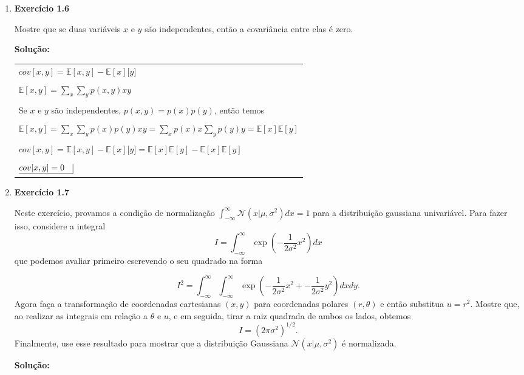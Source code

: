 \begin{enumerate}
\item \textbf{Exercício 1.6} \par

Mostre que se duas variáveis $x$ e $y$ são independentes, então a covariância entre elas é zero.
\newline \par
\textbf{Solução:}

\begin{tabular}{l}
\\
$cov[x,y]=\mathbb{E}[x,y]-\mathbb{E}[x]\mathbb[y]$\\
\\
$\mathbb{E}[x,y]=\sum_x \sum_y p(x,y) x y$\\
\\
Se $x$ e $y$ são independentes, $p(x,y)=p(x)p(y)$, então temos\\
\\
$\mathbb{E}[x,y]=\sum_x \sum_y p(x)p(y) x y = \sum_x p(x) x  \sum_y p(y) y = \mathbb{E}[x]\mathbb{E}[y]$\\
\\
$cov[x,y]=\mathbb{E}[x,y]-\mathbb{E}[x]\mathbb[y] = \mathbb{E}[x]\mathbb{E}[y] - \mathbb{E}[x]\mathbb{E}[y]$\\
\\
$\underline{cov[x,y] = 0\quad} \vline$
\end{tabular}


\item \textbf{Exercício 1.7} \par

Neste exercício, provamos a condição de normalização $\int_{-\infty}^{\infty}\mathcal{N}(x | \mu, \sigma^2) dx = 1 $ para a distribuição gaussiana univariável. Para fazer isso, considere a integral
\begin{equation*}
    I = \int_{-\infty}^{\infty}\exp\left(-\frac{1}{2\sigma^2}x^2\right)dx
\end{equation*}
que podemos avaliar primeiro escrevendo o seu quadrado na forma
\newline \par
\begin{equation*}
    I^2 = \int_{-\infty}^{\infty}\int_{-\infty}^{\infty}\exp\left(-\frac{1}{2\sigma^2}x^2 + -\frac{1}{2\sigma^2}y^2\right)dxdy.
\end{equation*}
Agora faça a transformação de coordenadas cartesianas $(x, y)$ para coordenadas polares $(r, \theta)$ e então substitua $u = r^2$. Mostre que, ao realizar as integrais em relação a $\theta$ e $u$, e em seguida, tirar a raiz quadrada de ambos os lados, obtemos
\begin{equation*}
    I = \left(2\pi\sigma^2\right)^{1/2}.
\end{equation*}
Finalmente, use esse resultado para mostrar que a distribuição Gaussiana $\mathcal{N}(x | \mu, \sigma^2)$ é normalizada.
\newline \par
\textbf{Solução:}


\end{enumerate}
